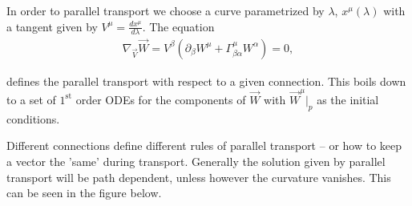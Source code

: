\documentclass[10pt]{article}
\begin{document}
    In order to parallel transport we choose a curve parametrized by $\lambda$,  $x^\mu (\lambda)$ with a tangent given by $V^\mu = \frac{d x^\mu}{d\lambda}$. The equation  
    \begin{align}
    \nabla_{\vec V} \vec W=V^\beta \left( \partial_\beta W ^\mu + \Gamma^\mu_{\beta \alpha} W^\alpha \right) = 0,
    \end{align}
    
    defines the parallel transport with respect to a given connection. This boils down to a set of $1^{\text{st}}$ order ODEs for the components of $\vec W$ with $\vec W^\mu|_p$ as the initial conditions. 
    
    Different connections define different rules of parallel transport -- or how to keep a vector the 'same' during transport. Generally the solution given by parallel transport will be path dependent, unless however the curvature vanishes. This can be seen in the figure below. \begin{figure}[h]
    \begin{center}
                        
                    
                    
                    \begin{tikzpicture}[x=0.75pt,y=0.75pt,yscale=-1,xscale=1]
                    

\end{tikzpicture}
\end{center}
\end{figure}
\end{document}
